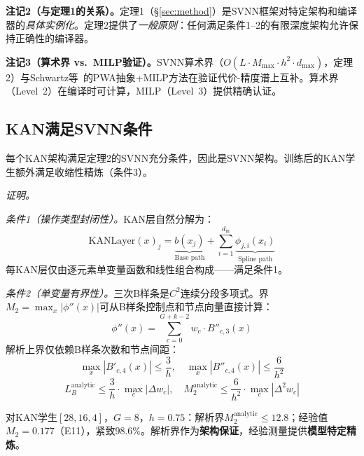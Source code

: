 \noindent\textbf{注记2（与定理1的关系）。}定理1（\S\ref{sec:method}）是SVNN框架对特定架构和编译器的\textit{具体实例化}。定理2提供了\textit{一般原则}：任何满足条件1--2的有限深度架构允许保持正确性的编译器。

\noindent\textbf{注记3（算术界 vs.\ MILP验证）。}SVNN算术界（$O(L \cdot M_{\max} \cdot h^2 \cdot d_{\max})$，定理2）与Schwartz等~\cite{schwartz2026optimal}的PWA抽象+MILP方法在验证代价-精度谱上互补。算术界（Level~2）在编译时可计算，MILP（Level~3）提供精确认证。

\subsection{KAN满足SVNN条件}
\label{sec:svnn-kan}

\begin{proposition}[KAN是结构可验证的]
\label{prop:kan-svnn}
每个KAN架构满足定理2的SVNN充分条件，因此是SVNN架构。训练后的KAN学生额外满足收缩性精炼（条件3）。
\end{proposition}

\vspace{4pt}
\noindent\textit{证明。}

\textit{条件1（操作类型封闭性）。}KAN层自然分解为：
\begin{equation}
\text{KANLayer}(x)_j = \underbrace{b(x_j)}_{\text{Base path}} + \sum_{i=1}^{d_{\text{in}}} \underbrace{\phi_{j,i}(x_i)}_{\text{Spline path}}
\label{eq:kan_decomposition}
\end{equation}
每KAN层仅由逐元素单变量函数和线性组合构成——满足条件1。

\textit{条件2（单变量有界性）。}三次B样条是$C^2$连续分段多项式。界$M_2 = \max_x |\phi''(x)|$可从B样条控制点和节点向量直接计算：
\begin{equation}
\phi''(x) = \sum_{c=0}^{G+k-2} w_c \cdot B''_{c,3}(x)
\label{eq:bspline_second_deriv}
\end{equation}
解析上界仅依赖B样条次数和节点间距：
\begin{equation}
\max_x |B'_{c,4}(x)| \leq \frac{3}{h}, \quad \max_x |B''_{c,4}(x)| \leq \frac{6}{h^2}
\label{eq:bspline_basis_bounds}
\end{equation}
\begin{equation}
L_B^{\text{analytic}} \leq \frac{3}{h} \cdot \max_c |\Delta w_c|, \quad M_2^{\text{analytic}} \leq \frac{6}{h^2} \cdot \max_c |\Delta^2 w_c|
\label{eq:bspline_diff_bounds}
\end{equation}

对KAN学生$[28,16,4]$，$G=8$，$h=0.75$：解析界$M_2^{\text{analytic}} \leq 12.8$；经验值$M_2 = 0.177$（E11），紧致$98.6\%$。解析界作为\textbf{架构保证}，经验测量提供\textbf{模型特定精炼}。

